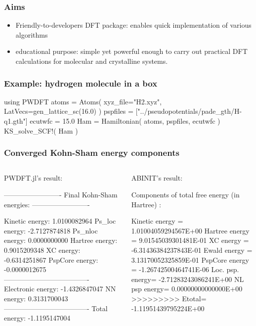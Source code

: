 \documentclass[english,9pt]{beamer}
\begin{document}
\begin{frame}
\frametitle{Aims}

\begin{itemize}
\item Friendly-to-developers DFT package: enables quick implementation of various algorithms
\item educational purpose: simple yet powerful enough to carry out practical DFT calculations
for molecular and crystalline systems.
\end{itemize}

\end{frame}


\begin{frame}[fragile]
\frametitle{Example: hydrogen molecule in a box}

\begin{juliacode}
using PWDFT
atoms = Atoms( xyz_file="H2.xyz",
               LatVecs=gen_lattice_sc(16.0) )
pspfiles = ["../pseudopotentials/pade_gth/H-q1.gth"]
ecutwfc = 15.0
Ham = Hamiltonian( atoms, pspfiles, ecutwfc )
KS_solve_SCF!( Ham )
\end{juliacode}

\end{frame}


\begin{frame}[fragile]
\frametitle{Converged Kohn-Sham energy components}

\begin{columns}

\begin{column}{0.45\textwidth}
PWDFT.jl's result:
\begin{textcode}
-------------------------
Final Kohn-Sham energies:
-------------------------

Kinetic    energy:       1.0100082964
Ps_loc     energy:      -2.7127874818
Ps_nloc    energy:       0.0000000000
Hartree    energy:       0.9015209348
XC         energy:      -0.6314251867
PspCore    energy:      -0.0000012675
-------------------------------------
Electronic energy:      -1.4326847047
NN         energy:       0.3131700043
-------------------------------------
Total      energy:      -1.1195147004
\end{textcode}
\end{column}

\begin{column}{0.55\textwidth}

ABINIT's result:
\begin{textcode}
Components of total free energy (in Hartree) :

   Kinetic energy  =  1.01004059294567E+00
   Hartree energy  =  9.01545039301481E-01
   XC energy       = -6.31436384237843E-01
   Ewald energy    =  3.13170052325859E-01
   PspCore energy  = -1.26742500464741E-06
   Loc. psp. energy= -2.71283243086241E+00
   NL   psp  energy=  0.00000000000000E+00
   >>>>>>>>> Etotal= -1.11951439795224E+00
\end{textcode}
\end{column}

\end{columns}

\end{frame}
\end{document}
